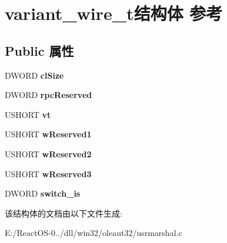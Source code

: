 \hypertarget{structvariant__wire__t}{}\section{variant\+\_\+wire\+\_\+t结构体 参考}
\label{structvariant__wire__t}
\subsection*{Public 属性}
\begin{DoxyCompactItemize}
\item 
\mbox{\label{structvariant__wire__t_a63de993bd960f42e8dd34ed5a50bf829}} 
D\+W\+O\+RD {\bfseries cl\+Size}
\item 
\mbox{\label{structvariant__wire__t_a79e12c7c3b0d3838c3cd65ee166ef11e}} 
D\+W\+O\+RD {\bfseries rpc\+Reserved}
\item 
\mbox{\label{structvariant__wire__t_aced7f1575a008bddbc2f62a81c9146a7}} 
U\+S\+H\+O\+RT {\bfseries vt}
\item 
\mbox{\label{structvariant__wire__t_a96de5366a5534f66cbd09e98c8bea917}} 
U\+S\+H\+O\+RT {\bfseries w\+Reserved1}
\item 
\mbox{\label{structvariant__wire__t_ab1cef60b3c9e1e3b2c03b3c3773b7da8}} 
U\+S\+H\+O\+RT {\bfseries w\+Reserved2}
\item 
\mbox{\label{structvariant__wire__t_a6a208b9c3e373a8e75d2c40dfd5a6962}} 
U\+S\+H\+O\+RT {\bfseries w\+Reserved3}
\item 
\mbox{\label{structvariant__wire__t_a0a99a7ecaf2e80dc604118ef51ac67d2}} 
D\+W\+O\+RD {\bfseries switch\+\_\+is}
\end{DoxyCompactItemize}


该结构体的文档由以下文件生成\+:\begin{DoxyCompactItemize}
\item 
E\+:/\+React\+O\+S-\/0../dll/win32/oleaut32/usrmarshal.\+c\end{DoxyCompactItemize}
